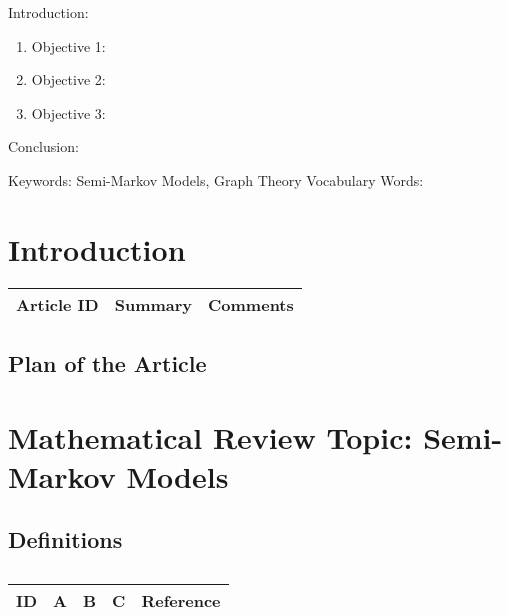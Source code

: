 
\twocolumn
\scriptsize
\begin{frontmatter}
		\title{}
		\author{}
		\address{The Mathematical Learning Space}
\end{frontmatter}	

Introduction:
\begin{enumerate}
\item Objective 1:
\item Objective 2:
\item Objective 3:
\end{enumerate}
Conclusion:

Keywords: Semi-Markov Models, Graph Theory
Vocabulary Words:

\section{Introduction}

\begin{table}[H]\centering
	\begin{tabular}{p{1cm}p{4cm}p{3cm}}
		Article ID & Summary & Comments\\
		\hline
		\hline
	\end{tabular}
\end{table}

\subsection{Plan of the Article}

\begin{enumerate}
\end{enumerate}


\section{Mathematical Review Topic: Semi-Markov Models}

\subsection{Definitions}

\centering
\begin{table}[H]\footnotesize
	\caption{}
	\begin{tabular}{rp{1cm}p{2cm}p{3cm}p{1cm}}
		\hline
		ID & A & B & C & Reference \\
		\hline
		\hline
	\end{tabular}
\end{table}
\raggedright

